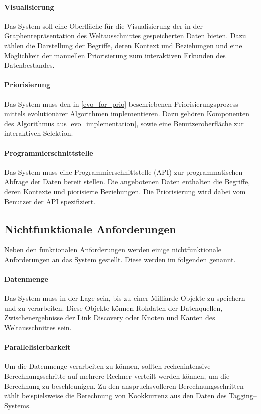 \paragraph{Visualisierung} Das System soll eine Oberfläche für die Visualisierung der in der Graphenrepräsentation des Weltausschnittes gespeicherten Daten bieten. Dazu zählen die Darstellung der Begriffe, deren Kontext und Beziehungen und eine Möglichkeit der manuellen Priorisierung zum interaktiven Erkunden des Datenbestandes.

\paragraph{Priorisierung} Das System muss den in \cref{evo_for_prio} beschriebenen Priorisierungsprozess mittels evolutionärer Algorithmen implementieren. Dazu gehören Komponenten des Algorithmus aus \cref{evo_implementation}, sowie eine Benutzeroberfläche zur interaktiven Selektion.

\paragraph{Programmierschnittstelle} Das System muss eine Programmierschnittstelle (API) zur programmatischen Abfrage der Daten bereit stellen. Die angebotenen Daten enthalten die Begriffe, deren Kontexte und piorisierte Beziehungen. Die Priorisierung wird dabei vom Benutzer der API spezifiziert.

\subsection{Nichtfunktionale Anforderungen}

Neben den funktionalen Anforderungen werden einige nichtfunktionale Anforderungen an das System gestellt. Diese werden im folgenden genannt.

\paragraph{Datenmenge} Das System muss in der Lage sein, bis zu einer Milliarde Objekte zu speichern und zu verarbeiten. Diese Objekte können Rohdaten der Datenquellen, Zwischenergebnisse der Link Discovery oder Knoten und Kanten des Weltausschnittes sein.

\paragraph{Parallelisierbarkeit} Um die Datenmenge verarbeiten zu können, sollten rechenintensive Berechnungsschritte auf mehrere Rechner verteilt werden können, um die Berechnung zu beschleunigen. Zu den anspruchsvolleren Berechnungsschritten zählt beispielsweise die Berechnung von Kookkurrenz aus den Daten des Tagging--Systems.

